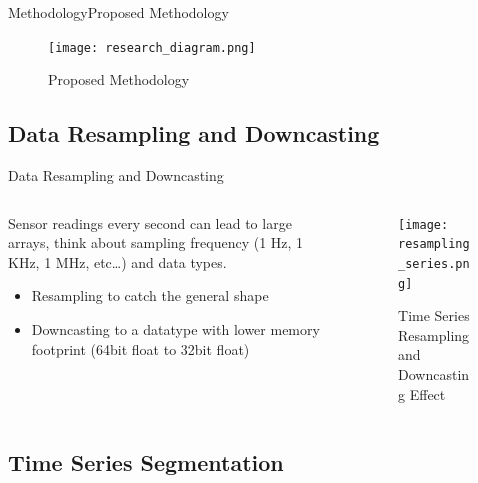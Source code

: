 \documentclass{beamer}
\begin{document}
        \begin{frame}{Methodology}{Proposed Methodology}
            \begin{figure}[!htbp]
                \centering
                \texttt{[image: research\_diagram.png]}
                \caption{Proposed Methodology}
            \end{figure}
        \end{frame}

        \subsection{Data Resampling and Downcasting}

            \begin{frame}{Data Resampling and Downcasting}
                \begin{columns}
                    \begin{column}{0.45\textwidth}
                        Sensor readings every second can lead to large arrays, think about sampling frequency (1 Hz, 1 KHz, 1 MHz, etc\dots) and data types.
                        \begin{itemize}
                            \item Resampling to catch the general shape
                            \item Downcasting to a datatype with lower memory footprint (64bit float to 32bit float)
                        \end{itemize}
                    \end{column}
                    \begin{column}{0.5\textwidth}
                        \begin{figure}[!htbp]
                            \centering
                            \texttt{[image: resampling\_series.png]}
                            \caption{Time Series Resampling and Downcasting Effect}
                        \end{figure}
                    \end{column}
                \end{columns}
            \end{frame}

        \subsection{Time Series Segmentation}
\end{document}
